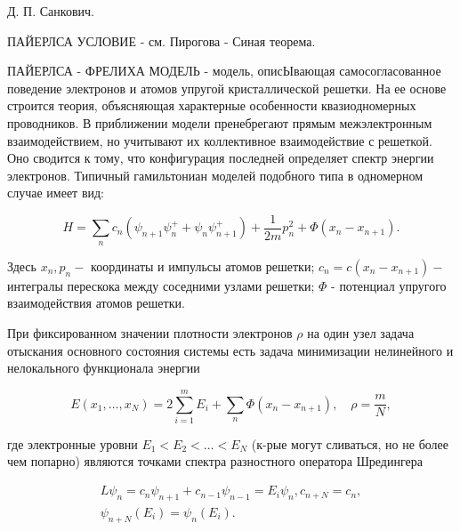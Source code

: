 \documentclass[10pt]{article}
\begin{document}
Д. П. Санкович.



ПАЙЕРЛСА УСЛОВИЕ - см. Пирогова - Синая теорема.



ПАЙЕРЛСА - ФРЕЛИХА МОДЕЛЬ - модель, описЫвающая самосогласованное поведение электронов и атомов упругой кристаллической решетки. На ее основе строится теория, объясняющая характерные особенности квазиодномерных проводников. В приближении модели пренебрегают прямым межэлектронным взаимодействием, но учитывают их коллективное взаимодействие с решеткой. Оно сводится к тому, что конфигурация последней определяет спектр энергии электронов. Типичный гамильтониан моделей подобного типа в одномерном случае имеет вид:



\[

H=\sum_{n} c_{n}\left(\psi_{n+1} \psi_{n}^{+}+\psi_{n} \psi_{n+1}^{+}\right)+\frac{1}{2 m} p_{n}^{2}+\Phi\left(x_{n}-x_{n+1}\right) .

\]



Здесь $x_{n}, p_{n}-$ координаты и импульсы атомов решетки; $c_{n}=c\left(x_{n}-x_{n+1}\right)-$ интегралы перескока между соседними узлами решетки; $\Phi$ - потенциал упругого взаимодействия атомов решетки.



При фиксированном значении плотности электронов $\rho$ на один узел задача отыскания основного состояния системы есть задача минимизации нелинейного и нелокального функционала энергии



\[

E\left(x_{1}, \ldots, x_{N}\right)=2 \sum_{i=1}^{m} E_{i}+\sum_{n} \Phi\left(x_{n}-x_{n+1}\right), \quad \rho=\frac{m}{N},

\]



где электронные уровни $E_{1}<E_{2}<\ldots<E_{N}$ (к-рые могут сливаться, но не более чем попарно) являются точками спектра разностного оператора Шредингера



\[

\begin{gathered}

L \psi_{n}=c_{n} \psi_{n+1}+c_{n-1} \psi_{n-1}=E_{i} \psi_{n}, c_{n+N}=c_{n}, \\

\psi_{n+N}\left(E_{i}\right)=\psi_{n}\left(E_{i}\right) .

\end{gathered}

\]
\end{document}
